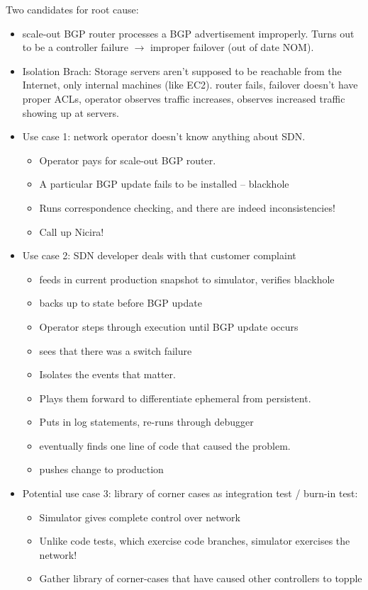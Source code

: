 Two candidates for root cause: 
\begin{itemize}
\item scale-out BGP router processes a BGP advertisement improperly. Turns out
to be a controller failure $\rightarrow$ improper failover (out of date NOM).
\item Isolation Brach: Storage servers aren't supposed to be reachable from the Internet, only
internal machines (like EC2). router fails, failover doesn't have proper ACLs, operator
observes traffic increases, observes increased traffic showing up at servers. 
\end{itemize}

\begin{itemize}
\item Use case 1: network operator doesn't know anything about SDN.
    \begin{itemize}
    \item Operator pays for scale-out BGP router. 
    \item A particular BGP update fails to be installed -- blackhole
    \item Runs correspondence checking, and there are indeed inconsistencies!
    \item Call up Nicira!
    \end{itemize}
\item Use case 2: SDN developer deals with that customer complaint
    \begin{itemize}
    \item feeds in current production snapshot to simulator, verifies
    blackhole 
    \item backs up to state before BGP update
    \item Operator steps through execution until BGP update occurs
    \item sees that there was a switch failure
    \item Isolates the events that matter.
    \item Plays them forward to differentiate ephemeral from persistent.
    \item Puts in log statements, re-runs through debugger
    \item eventually finds one line of code that caused the problem.
    \item pushes change to production
    \end{itemize}
\item Potential use case 3: library of corner cases as integration test /
burn-in test:
    \begin{itemize}
    \item Simulator gives complete control over network
    \item Unlike code tests, which exercise code branches, simulator exercises
    the network!
    \item Gather library of corner-cases that have caused other controllers to
    topple
    \end{itemize}
\end{itemize}

